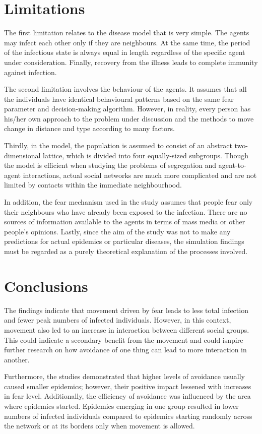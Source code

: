 \documentclass[11pt,a4paper]{article}
\begin{document}
\section{Limitations}
The first limitation relates to the disease model that is very simple. The agents may infect each other only if they are neighbours. At the same time, the period of the infectious state is always equal in length regardless of the specific agent under consideration. Finally, recovery from the illness leads to complete immunity against infection.

The second limitation involves the behaviour of the agents. It assumes that all the individuals have identical behavioural patterns based on the same fear parameter and decision-making algorithm. However, in reality, every person has his/her own approach to the problem under discussion and the methods to move change in distance and type according to many factors.

Thirdly, in the model, the population is assumed to consist of an abstract two-dimensional lattice, which is divided into four equally-sized subgroups. Though the model is efficient when studying the problems of segregation and agent-to-agent interactions, actual social networks are much more complicated and are not limited by contacts within the immediate neighbourhood.

In addition, the fear mechanism used in the study assumes that people fear only their neighbours who have already been exposed to the infection. There are no sources of information available to the agents in terms of mass media or other people's opinions.
Lastly, since the aim of the study was not to make any predictions for actual epidemics or particular diseases, the simulation findings must be regarded as a purely theoretical explanation of the processes involved.


\section{Conclusions}
The findings indicate that movement driven by fear leads to less total infection and fewer peak numbers of infected individuals. However, in this context, movement also led to an increase in interaction between different social groups. This could indicate a secondary benefit from the movement and could isnpire further research on how avoidance of one thing can lead to more interaction in another.

Furthermore, the studies demonstrated that higher levels of avoidance usually caused smaller epidemics; however, their positive impact lessened with increases in fear level. Additionally, the efficiency of avoidance was influenced by the area where epidemics started. Epidemics emerging in one group resulted in lower numbers of infected individuals compared to epidemics starting randomly across the network or at its borders only when movement is allowed.
\end{document}
